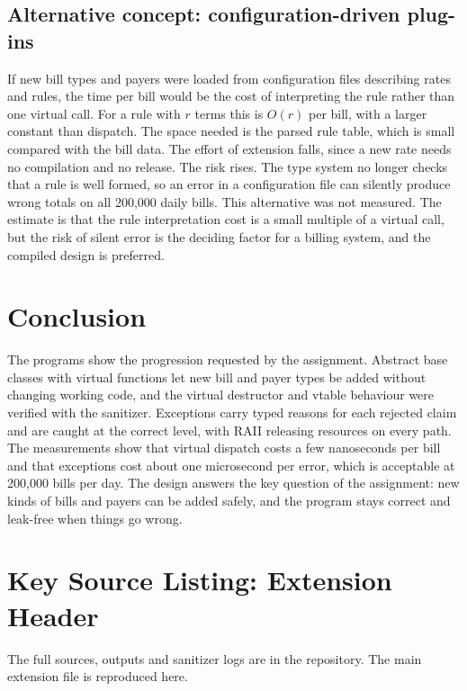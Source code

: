 \documentclass[11pt,a4paper]{article}
\begin{document}
\subsection*{Alternative concept: configuration-driven plug-ins}
If new bill types and payers were loaded from configuration files describing rates and rules, the time per bill would be the cost of interpreting the rule rather than one virtual call. For a rule with $r$ terms this is $O(r)$ per bill, with a larger constant than dispatch. The space needed is the parsed rule table, which is small compared with the bill data. The effort of extension falls, since a new rate needs no compilation and no release. The risk rises. The type system no longer checks that a rule is well formed, so an error in a configuration file can silently produce wrong totals on all 200{,}000 daily bills. This alternative was not measured. The estimate is that the rule interpretation cost is a small multiple of a virtual call, but the risk of silent error is the deciding factor for a billing system, and the compiled design is preferred.

\section{Conclusion}
The programs show the progression requested by the assignment. Abstract base classes with virtual functions let new bill and payer types be added without changing working code, and the virtual destructor and vtable behaviour were verified with the sanitizer. Exceptions carry typed reasons for each rejected claim and are caught at the correct level, with RAII releasing resources on every path. The measurements show that virtual dispatch costs a few nanoseconds per bill and that exceptions cost about one microsecond per error, which is acceptable at 200{,}000 bills per day. The design answers the key question of the assignment: new kinds of bills and payers can be added safely, and the program stays correct and leak-free when things go wrong.

\appendix
\section{Key Source Listing: Extension Header}
The full sources, outputs and sanitizer logs are in the repository. The main extension file is reproduced here.

\end{document}
